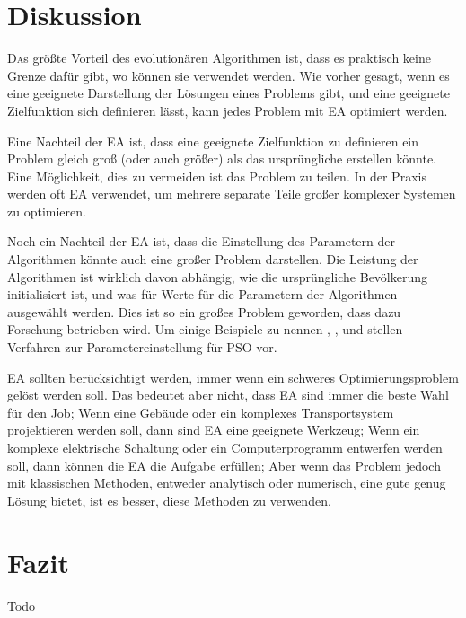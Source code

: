 \documentclass[twoside,twocolumn]{article}
\begin{document}

\section{Diskussion}
\lettrine[nindent=0em,lines=3]{D} as größte Vorteil des evolutionären Algorithmen ist, dass es praktisch keine Grenze dafür gibt, wo können sie verwendet werden. Wie vorher gesagt, wenn es eine geeignete Darstellung der Lösungen eines Problems gibt, und eine geeignete Zielfunktion sich definieren lässt, kann jedes Problem mit EA optimiert werden.\par
Eine Nachteil der EA ist, dass eine geeignete Zielfunktion zu definieren ein Problem gleich groß (oder auch größer) als das ursprüngliche erstellen könnte. Eine Möglichkeit, dies zu vermeiden ist das Problem zu teilen. In der Praxis werden oft EA verwendet, um mehrere separate Teile großer komplexer Systemen zu optimieren.\par
Noch ein Nachteil der EA ist, dass die Einstellung des Parametern der Algorithmen könnte auch eine großer Problem darstellen. Die Leistung der Algorithmen ist wirklich davon abhängig, wie die ursprüngliche Bevölkerung initialisiert ist, und was für Werte für die Parametern der Algorithmen ausgewählt werden. Dies ist so ein großes Problem geworden, dass dazu Forschung betrieben wird. Um einige Beispiele zu nennen \cite{pso_tuning_a}, \cite{pso_tuning_b}, und \cite{pso_tuning_c} stellen Verfahren zur Parametereinstellung für PSO vor.\par
EA sollten berücksichtigt werden, immer wenn ein schweres Optimierungsproblem gelöst werden soll. Das bedeutet aber nicht, dass EA sind immer die beste Wahl für den Job; Wenn eine Gebäude oder ein komplexes Transportsystem projektieren werden soll, dann sind EA eine geeignete Werkzeug; Wenn ein komplexe elektrische Schaltung oder ein Computerprogramm entwerfen werden soll, dann können die EA die Aufgabe erfüllen; Aber wenn das Problem jedoch mit klassischen Methoden, entweder analytisch oder numerisch, eine gute genug Lösung bietet, ist es besser, diese Methoden zu verwenden.


\section{Fazit}

Todo


\renewcommand{\refname}{Quellenverzeichnis}




\end{document}
